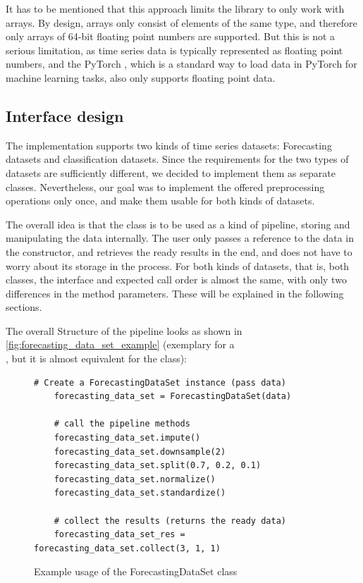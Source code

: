 \documentclass[review]{AIM_report}
\begin{document}
It has to be mentioned that this approach limits the library to only work with \numpy arrays. By design, \numpy arrays only consist of elements of the same type, and therefore only arrays of 64-bit floating point numbers are supported. But this is not a serious limitation, as time series data is typically represented as floating point numbers, and the PyTorch \dataLoader, which is a standard way to load data in PyTorch for machine learning tasks, also only supports floating point data.

\subsection{Interface design}

The implementation supports two kinds of time series datasets: Forecasting datasets and classification datasets. Since the requirements for the two types of datasets are sufficiently different, we decided to implement them as separate classes. Nevertheless, our goal was to implement the offered preprocessing operations only once, and make them usable for both kinds of datasets.

The overall idea is that the class is to be used as a kind of pipeline, storing and manipulating the data internally. The user only passes a reference to the data in the constructor, and retrieves the ready results in the end, and does not have to worry about its storage in the process. For both kinds of datasets, that is, both classes, the interface and expected call order is almost the same, with only two differences in the method parameters. These will be explained in the following sections.

The overall Structure of the pipeline looks as shown in \autoref{fig:forecasting_data_set_example} (exemplary for a \\
\forecastingDataSet, but it is almost equivalent for the \classificationDataSet class):
\begin{figure}[H]
    \begin{lstlisting}[style=python]
    # Create a ForecastingDataSet instance (pass data)
    forecasting_data_set = ForecastingDataSet(data)

    # call the pipeline methods
    forecasting_data_set.impute()
    forecasting_data_set.downsample(2)
    forecasting_data_set.split(0.7, 0.2, 0.1)
    forecasting_data_set.normalize()
    forecasting_data_set.standardize()

    # collect the results (returns the ready data)
    forecasting_data_set_res = forecasting_data_set.collect(3, 1, 1)
    \end{lstlisting}
    \caption{Example usage of the ForecastingDataSet class}
    \label{fig:forecasting_data_set_example}
\end{figure}
\end{document}
